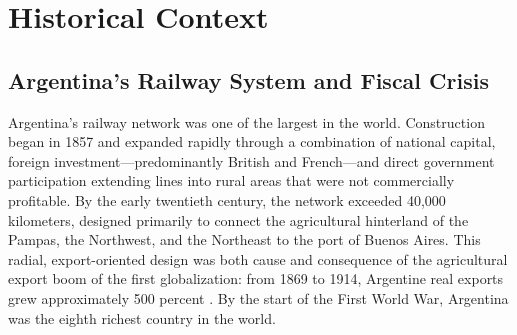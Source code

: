 %
%
%
%

\section{Historical Context}
\label{sec:history}

\subsection{Argentina's Railway System and Fiscal Crisis}
\label{ssec:railway_history}

Argentina's railway network was one of the largest in the world.
Construction began in 1857 and expanded rapidly through a combination
of national capital, foreign investment—predominantly British and
French—and direct government participation extending lines into rural
areas that were not commercially profitable. By the early twentieth
century, the network exceeded 40{,}000 kilometers, designed primarily
to connect the agricultural hinterland of the Pampas, the Northwest,
and the Northeast to the port of Buenos Aires. This radial,
export-oriented design was both cause and consequence of the
agricultural export boom of the first globalization: from 1869 to
1914, Argentine real exports grew approximately 500 percent
\citep{fajgelbaumredding2022}. By the start of the First World War,
Argentina was the eighth richest country in the world.


